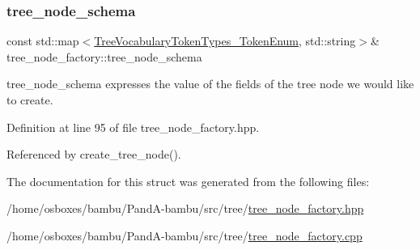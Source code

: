 \mbox{\label{structtree__node__factory_af6be06f05d1d0cd8440af1ef4e2a04e6}} 
\subsubsection{\texorpdfstring{tree\+\_\+node\+\_\+schema}{tree\_node\_schema}}
{\footnotesize\ttfamily const std\+::map$<$\hyperlink{token__interface_8hpp_a14502d0757789149f644966ca931b126}{Tree\+Vocabulary\+Token\+Types\+\_\+\+Token\+Enum}, std\+::string$>$\& tree\+\_\+node\+\_\+factory\+::tree\+\_\+node\+\_\+schema\hspace{0.3cm}{\ttfamily [private]}}



tree\+\_\+node\+\_\+schema expresses the value of the fields of the tree node we would like to create. 



Definition at line 95 of file tree\+\_\+node\+\_\+factory.\+hpp.



Referenced by create\+\_\+tree\+\_\+node().



The documentation for this struct was generated from the following files\+:\begin{DoxyCompactItemize}
\item 
/home/osboxes/bambu/\+Pand\+A-\/bambu/src/tree/\hyperlink{tree__node__factory_8hpp}{tree\+\_\+node\+\_\+factory.\+hpp}\item 
/home/osboxes/bambu/\+Pand\+A-\/bambu/src/tree/\hyperlink{tree__node__factory_8cpp}{tree\+\_\+node\+\_\+factory.\+cpp}\end{DoxyCompactItemize}
